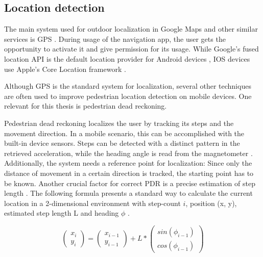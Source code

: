 

\subsection{Location detection}
The main system used for outdoor localization in Google Maps and other similar services is GPS \cite{google_maps}. During usage of the navigation app, the user gets the opportunity to activate it and give permission for its usage. While Google's fused location API is the default location provider for Android devices \cite{fused_location_api}, IOS devices use Apple's Core Location framework \cite{core_location_framework}.

Although GPS is the standard system for localization, several other techniques are often used to improve pedestrian location detection on mobile devices. One relevant for this thesis is pedestrian dead reckoning.

Pedestrian dead reckoning localizes the user by tracking its steps and the movement direction. In a mobile scenario, this can be accomplished with the built-in device sensors. Steps can be detected with a distinct pattern in the retrieved acceleration, while the heading angle is read from the magnetometer \cite{PDR}. Additionally, the system needs a reference point for localization: Since only the distance of movement in a certain direction is tracked, the starting point has to be known. Another crucial factor for correct PDR is a precise estimation of step length \cite{PDR}. The following formula presents a standard way to calculate the current location in a 2-dimensional environment with step-count $i$, position (x, y), estimated step length L and heading $\phi$ \cite{PDR_2}.

\begin{equation}
    \begin{pmatrix}x_{i}\\y_{i}\end{pmatrix} = \begin{pmatrix}x_{i-1}\\y_{i-1}\end{pmatrix} + L * \begin{pmatrix}sin(\phi_{i-1})\\cos(\phi_{i-1})\end{pmatrix}
\end{equation}

